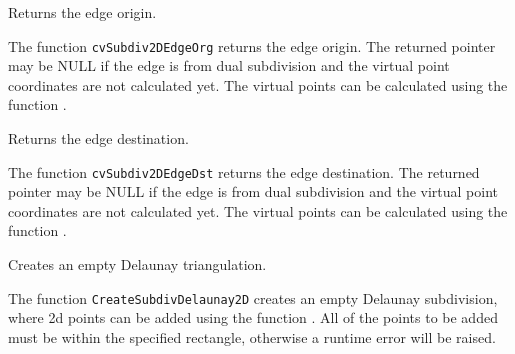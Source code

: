 \label{Subdiv2DEdgeOrg}

Returns the edge origin.


\begin{description}
\end{description}

The function \texttt{cvSubdiv2DEdgeOrg} returns the edge
origin. The returned pointer may be NULL if the edge is from dual
subdivision and the virtual point coordinates are not calculated
yet. The virtual points can be calculated using the function
.

\label{Subdiv2DEdgeDst}

Returns the edge destination.


\begin{description}
\end{description}

The function \texttt{cvSubdiv2DEdgeDst} returns the edge destination. The
returned pointer may be NULL if the edge is from dual subdivision and
the virtual point coordinates are not calculated yet. The virtual points
can be calculated using the function .

\label{CreateSubdivDelaunay2D}

Creates an empty Delaunay triangulation.


\begin{description}
\end{description}

The function \texttt{CreateSubdivDelaunay2D} creates an empty Delaunay
subdivision, where 2d points can be added using the function
. All of the points to be added must be within
the specified rectangle, otherwise a runtime error will be raised.

